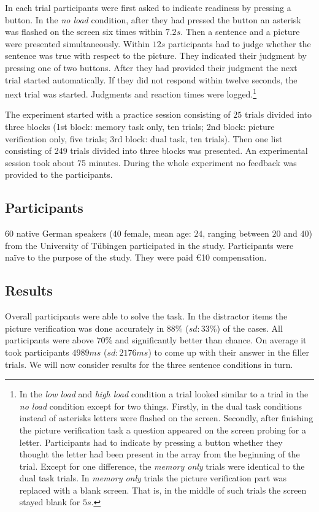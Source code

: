 \documentclass[fleqn,reqno,10pt,draft]{article}
\begin{document}
In each trial participants were first asked to indicate readiness by pressing a button. In the {\it no load} condition, after they had pressed the button an  asterisk was flashed on the screen six times within $7.2s$. Then a sentence and a picture were presented simultaneously. Within $12s$ participants had to judge whether the sentence was true with respect to the picture. They indicated their judgment by pressing one of two buttons. After they had provided their judgment the next trial started automatically. If they did not respond within twelve seconds, the next trial was started. Judgments and reaction times were logged.\footnote{In the {\it low load} and {\it high load} condition a trial looked similar to a trial in the {\it no load} condition except for two things. Firstly, in the dual task conditions instead of asterisks letters were flashed on the screen. Secondly, after finishing the picture verification task a question appeared on the screen probing for a letter. Participants had to indicate by pressing a button whether they thought the letter had been present in the array from the beginning of the trial. Except for one difference, the {\it memory only} trials were identical to the dual task trials. In {\it memory only} trials the picture verification part was replaced with a blank screen. That is, in the middle of such trials the screen stayed blank for $5s$. }

The experiment started with a practice session consisting of $25$ trials divided into three blocks (1st block: memory task only, ten trials; 2nd block: picture verification only, five trials; 3rd block: dual task, ten trials). Then one list consisting of 249 trials divided into three blocks was presented. An experimental session took about 75 minutes. During the whole experiment no feedback was provided to the participants.

\subsection{Participants}
60 native German speakers (40 female, mean age: $24$, ranging between $20$ and $40$) from the University of T{\"u}bingen participated in the study. Participants were na\"ive to the purpose of the study. They were paid \euro{10} compensation. 

\subsection{Results}
Overall participants were able to solve the task. In the distractor items the picture verification was done accurately in $88\%$ ($sd: 33\%$) of the cases. All participants were above $70\%$ and significantly better than chance. On average it took participants $4989ms$ ($sd:2176ms$) to come up with their answer in the filler trials. We will now consider results for the three sentence conditions in turn.
\end{document}
